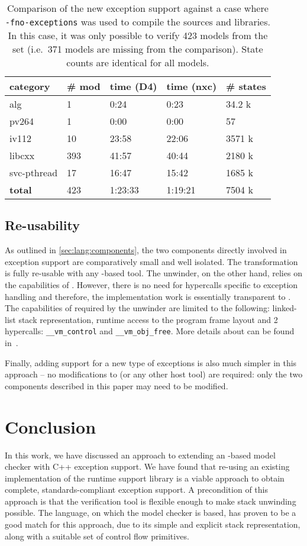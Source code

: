 \begin{table}[tp]
\caption{\label{tbl:D4nxc}Comparison of the new exception support
against a case where \texttt{-fno-exceptions} was used to compile the
sources and libraries. In this case, it was only possible to verify 423
models from the set (i.e.~371 models are missing from the comparison).
State counts are identical for all models. }
\begin{tabularx}{\textwidth}{llLLL}
\toprule
category & \# mod & time (D4) & time (nxc) & \# states\tabularnewline
\midrule
alg & 1 & 0:24 & 0:23 & 34.2 k\tabularnewline
pv264 & 1 & 0:00 & 0:00 & 57\tabularnewline
iv112 & 10 & 23:58 & 22:06 & 3571 k\tabularnewline
libcxx & 393 & 41:57 & 40:44 & 2180 k\tabularnewline
svc-pthread & 17 & 16:47 & 15:42 & 1685 k\tabularnewline
\textbf{total} & 423 & 1:23:33 & 1:19:21 & 7504 k\tabularnewline
\bottomrule
\end{tabularx}
\end{table}

\subsection{Re-usability}\label{sec:lang:re-usability}

As outlined in \autoref{sec:lang:components}, the two components directly
involved in exception support are comparatively small and well isolated.
The \llvm{} transformation is fully re-usable with any \llvm{}-based tool. The
unwinder, on the other hand, relies on the capabilities of \divm{}.
However, there is no need for hypercalls specific to exception handling
and therefore, the implementation work is essentially transparent to
\divm{}. The capabilities of \divm{} required by the unwinder are limited to
the following: linked-list stack representation, runtime access to the
program frame layout and 2 hypercalls:
\texttt{\_\_vm\_control} and \texttt{\_\_vm\_obj\_free}. More details about
\divm{} can be found in~.

Finally, adding support for a new type of exceptions is also much
simpler in this approach -- no modifications to \divm{} (or any other host
tool) are required: only the two components described in this paper may
need to be modified.

\section{Conclusion}\label{sec:lang:conclusion}

In this work, we have discussed an approach to extending an \llvm{}-based
model checker with C++ exception support. We have found that re-using an
existing implementation of the runtime support library is a viable
approach to obtain complete, standards-compliant exception support. A
precondition of this approach is that the verification tool is flexible
enough to make stack unwinding possible. The \divm{} language, on which the
\divine{} model checker is based, has proven to be a good match for this
approach, due to its simple and explicit stack representation, along
with a suitable set of control flow primitives.

